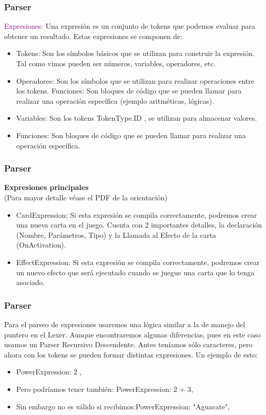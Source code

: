 \documentclass{beamer}
\begin{document}
\begin{frame}
  \frametitle{Parser}
  \textcolor{purple}{Expresiones:} Una expresión es un conjunto de tokens que podemos evaluar para obtener un resultado. Estas expresiones se componen de:
  \begin{itemize}
    \item Tokens: Son los símbolos básicos que se utilizan para construir la expresión. Tal como vimos pueden ser números, variables, operadores, etc.
    \item Operadores: Son los símbolos que se utilizan para realizar operaciones entre los tokens. Funciones: Son bloques de código que se pueden llamar para realizar una operación específica (ejemplo aritméticas, lógicas).
    \item Variables: Son los tokens TokenType.ID , se utilizan para almacenar valores.
    \item Funciones: Son bloques de código que se pueden llamar para realizar una operación específica.
  \end{itemize}
\end{frame}


\begin{frame}
  \frametitle{Parser}
  \textbf{Expresiones principales} \\
  (Para mayor detalle véase el PDF de la orientación)

  \begin{itemize}
    \item CardExpression: Si esta expresión se compila correctamente, podremos crear una nueva carta en el juego. Cuenta con 2 importantes detalles, la declaración (Nombre, Parámetros, Tipo) y la Llamada al Efecto de la carta (OnActivation).
    \item EffectExpression: Si esta expresión se compila correctamente, podremos crear un nuevo efecto que será ejecutado cuando se juegue una carta que lo tenga asociado.
  \end{itemize}
\end{frame}

\begin{frame}
  \frametitle{Parser}
  Para el parseo de expresiones usaremos una lógica similar a la de manejo del puntero en el Lexer. Aunque encontraremos algunas diferencias, pues en este caso usamos un Parser Recursivo Descendente.
  Antes teníamos sólo caracteres, pero ahora con los tokens se pueden formar distintas expresiones. Un ejemplo de esto:

  \begin{itemize}
    \item PowerExpression: 2 ,
    \item   Pero podríamos tener también:
          PowerExpression: 2 + 3,
    \item Sin embargo no es válido si recibimos:PowerExpression: "Aguacate",
  \end{itemize}
\end{frame}
\end{document}
